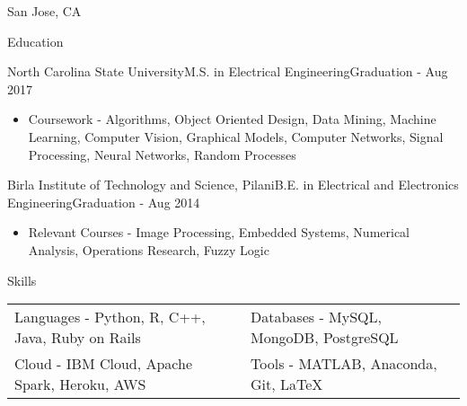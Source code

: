 \documentclass[]{mcdowellcv}
\begin{document}
	\makeheader
    \vspace{-.1cm}
    \begin{center}
		San Jose, CA
    \end{center}
	
    \vspace{-.6cm}
    
    \begin{cvsection}{Education}
		
        \vspace{.2cm}
        
        \begin{cvsubsection}{North Carolina State University}{M.S. in Electrical Engineering}{Graduation - Aug 2017}
			\vspace{-.3cm}
            \begin{itemize}
				\item Coursework - Algorithms, Object Oriented Design, Data Mining, Machine Learning, Computer Vision, Graphical Models, Computer Networks, Signal Processing, Neural Networks, Random Processes
           \end{itemize}
        \end{cvsubsection}
        
        \vspace{-.1cm}
        
        \begin{cvsubsection}{Birla Institute of Technology and Science, Pilani}{B.E. in Electrical and Electronics Engineering}{Graduation - Aug 2014}
			\vspace{-.1cm}
            \begin{itemize}
				\item Relevant Courses - Image Processing, Embedded Systems, Numerical Analysis, Operations Research, Fuzzy Logic
           \end{itemize}
        \end{cvsubsection}
	\end{cvsection}
    
    \vspace{-.2cm}
    
    \begin{cvsection}{Skills}
        
        \vspace{.05cm}
        
        \begin{cvsubsection}{}{}{}
            
            \begin{tabular}{p{10cm} p{10cm}}
            
            	{ Languages - Python, R, C++, Java, Ruby on Rails } & { Databases - MySQL, MongoDB, PostgreSQL } \\
                { Cloud - IBM Cloud, Apache Spark, Heroku, AWS } & { Tools - MATLAB, Anaconda, Git, \LaTeX }
			\end{tabular}
            
        \end{cvsubsection}
	
    \end{cvsection}
    
\end{document}
